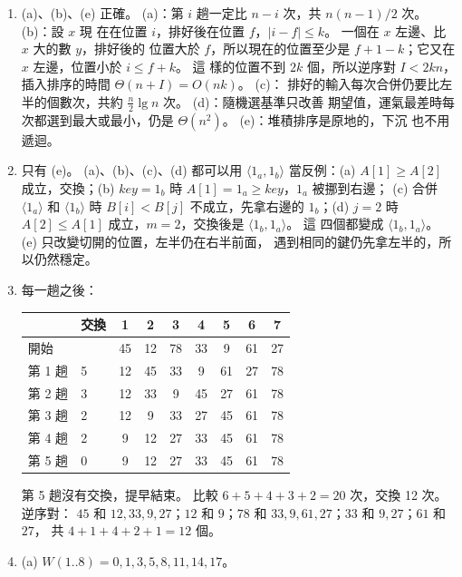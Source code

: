 \begin{enumerate}
\item (a)、(b)、(e) 正確。 (a)：第 $i$ 趟一定比 $n - i$ 次，共 $n(n-1)/2$ 次。 (b)：設 $x$ 現
在在位置 $i$，排好後在位置 $f$，$|i - f| \le k$。 一個在 $x$ 左邊、比 $x$ 大的數 $y$，排好後的
位置大於 $f$，所以現在的位置至少是 $f + 1 - k$；它又在 $x$ 左邊，位置小於 $i \le f + k$。 這
樣的位置不到 $2k$ 個，所以逆序對 $I < 2kn$，插入排序的時間 $\Theta(n + I) = O(nk)$。 (c)：
排好的輸入每次合併仍要比左半的個數次，共約 $\frac{n}{2}\lg n$ 次。 (d)：隨機選基準只改善
期望值，運氣最差時每次都選到最大或最小，仍是 $\Theta(n^2)$。 (e)：堆積排序是原地的，下沉
也不用遞迴。

\item 只有 (e)。 (a)、(b)、(c)、(d) 都可以用 $\langle 1_a, 1_b \rangle$ 當反例：(a) $A[1] \ge
A[2]$ 成立，交換；(b) $\mathit{key} = 1_b$ 時 $A[1] = 1_a \ge \mathit{key}$，$1_a$ 被挪到右邊；
(c) 合併 $\langle 1_a \rangle$ 和 $\langle 1_b \rangle$ 時 $B[i] < B[j]$ 不成立，先拿右邊的
$1_b$；(d) $j = 2$ 時 $A[2] \le A[1]$ 成立，$m = 2$，交換後是 $\langle 1_b, 1_a \rangle$。 這
四個都變成 $\langle 1_b, 1_a \rangle$。 (e) 只改變切開的位置，左半仍在右半前面，
遇到相同的鍵仍先拿左半的，所以仍然穩定。

\item 每一趟之後：
\begin{center}
\begin{tabular}{ll*{7}{c}}
\toprule
& 交換 & 1 & 2 & 3 & 4 & 5 & 6 & 7 \\
\midrule
開始 & & 45 & 12 & 78 & 33 & 9 & 61 & 27 \\
第 1 趟 & 5 & 12 & 45 & 33 & 9 & 61 & 27 & 78 \\
第 2 趟 & 3 & 12 & 33 & 9 & 45 & 27 & 61 & 78 \\
第 3 趟 & 2 & 12 & 9 & 33 & 27 & 45 & 61 & 78 \\
第 4 趟 & 2 & 9 & 12 & 27 & 33 & 45 & 61 & 78 \\
第 5 趟 & 0 & 9 & 12 & 27 & 33 & 45 & 61 & 78 \\
\bottomrule
\end{tabular}
\end{center}
第 5 趟沒有交換，提早結束。 比較 $6 + 5 + 4 + 3 + 2 = 20$ 次，交換 12 次。 逆序對：
$45$ 和 $12, 33, 9, 27$；$12$ 和 $9$；$78$ 和 $33, 9, 61, 27$；$33$ 和 $9, 27$；$61$ 和 $27$，
共 $4 + 1 + 4 + 2 + 1 = 12$ 個。

\item (a) $W(1..8) = 0, 1, 3, 5, 8, 11, 14, 17$。


\end{enumerate}
